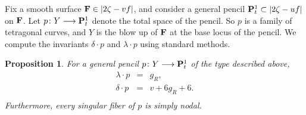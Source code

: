 \documentclass[reqno, 10 pt]{article}
\newtheorem{prop}[thm]{Proposition}
\theoremstyle{definition}
\theoremstyle{remark}
\numberwithin{equation}{section}
\numberwithin{thm}{section}
\numberwithin{prop}{section}
\numberwithin{lem}{section}
\numberwithin{cor}{section}
\numberwithin{conj}{section}
\numberwithin{defn}{section}
\newcommand{\F}{{\mathbf F}}
\renewcommand{\F}{{\bf F}}
\begin{document}
\subsubsection{}
Fix a smooth surface $\F \in |2\zeta - vf|$, and consider a general pencil ${\bf P}^1_t \subset |2\zeta-uf|$ on $\F$.  Let $p \colon Y \longrightarrow {\bf P}^1_t$ denote the total space of the pencil. So $p$ is a family of tetragonal curves, and $Y$ is the blow up of $\F$ at the base locus of the pencil. We  compute the invariants $\delta \cdot p$ and $\lambda \cdot p$ using standard methods. 

\begin{prop}\label{basictetragonal} For a general pencil $p \colon Y \longrightarrow {\bf P}^1_t$ of the type described above,
\begin{eqnarray*}
 \lambda \cdot p &=& g_R,\\
 \delta \cdot p &=& v + 6g_R + 6.\\
 \end{eqnarray*} 
 Furthermore, every singular fiber of $p$ is simply nodal.
\end{prop}
\end{document}
